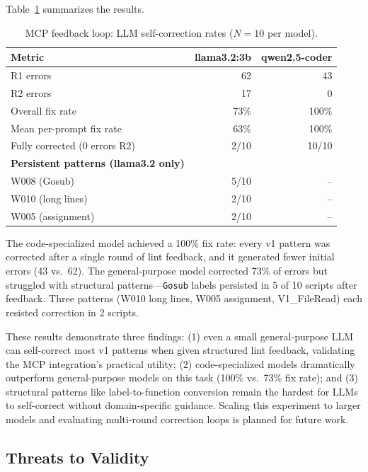 \documentclass[11pt,a4paper]{article}
\begin{document}
\begin{enumerate}
Table~\ref{tab:mcp_loop} summarizes the results.

\begin{table}[h]
\centering\small
\caption{MCP feedback loop: LLM self-correction rates ($N=10$ per model).}
\label{tab:mcp_loop}
\begin{tabular}{lrr}
\toprule
\textbf{Metric} & \textbf{llama3.2:3b} & \textbf{qwen2.5-coder} \\
\midrule
R1 errors & 62 & 43 \\
R2 errors & 17 & 0 \\
Overall fix rate & 73\% & 100\% \\
Mean per-prompt fix rate & 63\% & 100\% \\
Fully corrected (0 errors R2) & 2/10 & 10/10 \\
\midrule
\textbf{Persistent patterns (llama3.2 only)} \\
\quad W008 (Gosub) & 5/10 & -- \\
\quad W010 (long lines) & 2/10 & -- \\
\quad W005 (assignment) & 2/10 & -- \\
\bottomrule
\end{tabular}
\end{table}

The code-specialized model achieved a 100\% fix rate: every v1 pattern was corrected after a single round of lint feedback, and it generated fewer initial errors (43 vs.\ 62). The general-purpose model corrected 73\% of errors but struggled with structural patterns---\texttt{Gosub} labels persisted in 5 of 10 scripts after feedback. Three patterns (W010 long lines, W005 assignment, V1\_FileRead) each resisted correction in 2 scripts.

These results demonstrate three findings: (1) even a small general-purpose LLM can self-correct most v1 patterns when given structured lint feedback, validating the MCP integration's practical utility; (2) code-specialized models dramatically outperform general-purpose models on this task (100\% vs.\ 73\% fix rate); and (3) structural patterns like label-to-function conversion remain the hardest for LLMs to self-correct without domain-specific guidance. Scaling this experiment to larger models and evaluating multi-round correction loops is planned for future work.

\subsection{Threats to Validity}


\end{enumerate}
\end{document}
